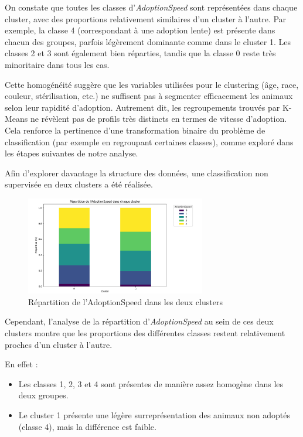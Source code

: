 \documentclass[a4paper,12pt]{article}
\begin{document}
On constate que toutes les classes d’\textit{AdoptionSpeed} sont représentées dans chaque cluster, avec des proportions relativement similaires d’un cluster à l’autre. Par exemple, la classe 4 (correspondant à une adoption lente) est présente dans chacun des groupes, parfois légèrement dominante comme dans le cluster 1. Les classes 2 et 3 sont également bien réparties, tandis que la classe 0 reste très minoritaire dans tous les cas.

Cette homogénéité suggère que les variables utilisées pour le clustering (âge, race, couleur, stérilisation, etc.) ne suffisent pas à segmenter efficacement les animaux selon leur rapidité d’adoption. Autrement dit, les regroupements trouvés par K-Means ne révèlent pas de profils très distincts en termes de vitesse d’adoption. Cela renforce la pertinence d’une transformation binaire du problème de classification (par exemple en regroupant certaines classes), comme exploré dans les étapes suivantes de notre analyse.

Afin d'explorer davantage la structure des données, une classification non supervisée en deux clusters a été réalisée.

\begin{figure}[H]
    \centering
    \includegraphics[width=0.7\textwidth]{repartition_adoptionspeed_2clusters.png}
    \caption{Répartition de l'AdoptionSpeed dans les deux clusters}
    \label{fig:repartition_adoptionspeed_2clusters}
\end{figure}

Cependant, l'analyse de la répartition d'\textit{AdoptionSpeed} au sein de ces deux clusters montre que les proportions des différentes classes restent relativement proches d'un cluster à l'autre.

En effet :
\begin{itemize}
    \item Les classes 1, 2, 3 et 4 sont présentes de manière assez homogène dans les deux groupes.
    \item Le cluster 1 présente une légère surreprésentation des animaux non adoptés (classe 4), mais la différence est faible.
\end{itemize}
\end{document}

